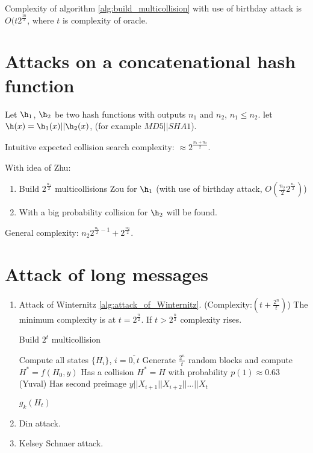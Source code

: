 \begin{remark}
    Complexity of algorithm \ref{alg:build_multicollision} with use of birthday attack
    is $O(t 2^{\frac{m}{2}}$, where $t$ is complexity of oracle.
\end{remark}

\section{Attacks on a concatenational hash function}

Let $\h_1$, $\h_2$ be two hash functions with outputs $n_1$ and $n_2$, $n_1 \leqslant n_2$.
let $\h(x) = \h_1(x) || \h_2(x)$, (for example $MD5 || SHA1$).

Intuitive expected collision search complexity: $\approx 2^{\frac{n_1 + n_2}{2}}$.

With idea of Zhu:
\begin{enumerate}
    \item Build $2^{\frac{n_1}{2}}$ multicollisions Zou for $\h_1$
        (with use of birthday attack, $O(\frac{n_2}{2} 2^{\frac{n_1}{2}})$)
    \item With a big probability collision for $\h_2$ will be found.
\end{enumerate}
General complexity: $n_2 2^{\frac{n_1}{2} - 1} + 2^{\frac{n_2}{2}}$.

\section{Attack of long messages}

\begin{enumerate}
    \item Attack of Winternitz \ref{alg:attack_of_Winternitz}. (Complexity:$(t+\frac{2^n}{t})$)
        The minimum complexity is at $t = 2^{\frac{n}{2}}$.
        If $t > 2^{\frac{n}{2}}$ complexity rises.

        \begin{algorithm2e}[ht]
            \caption{Build $2^t$ multicollision}
            \label{alg:attack_of_Winternitz}
            
        
            Compute all states $\{H_i\}$, $i = \overline{0, t}$\;
            Generate $\frac{2^n}{t}$ random blocks and compute $H^* = f(H_0, y)$\;
            Has a collision $H^* = H$ with probability $p(1) \approx 0.63$ (Yuval)\;
            Has second preimage $y || X_{i+1} || X_{i+2} || ... || X_{t}$
            
            \Return $g_k(H_t)$\;
        \end{algorithm2e}
    \item Din attack.
    \item Kelsey Schnaer attack.
\end{enumerate}

